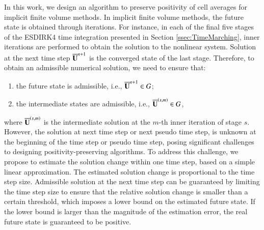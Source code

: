 In this work, we design an algorithm to preserve positivity of cell averages for implicit finite volume methods. In implicit finite volume methods, the future state is obtained through iterations. For instance, in each of the final five stages of the ESDIRK4 time integration presented in Section \ref{ssec:TimeMarching}, inner iterations are performed to obtain the solution to the  nonlinear system. Solution at the next time step $\overline{\mathbf{U}}^{n+1}$ is the converged state of the last stage. Therefore, to obtain an admissible numerical solution, we need to ensure that:
\begin{enumerate}[label=(\alph*)]
    \item the future state is admissible, i.e., $\overline{\mathbf{U}}^{n+1} \in G$;
    \item the intermediate states are admissible, i.e., $\overline{\mathbf{U}}^{\left(s,m\right)} \in G$,
\end{enumerate}
where $\overline{\mathbf{U}}^{\left(s,m\right)}$ is the intermediate solution at the $m$-th inner iteration of stage $s$. However, the solution at next time step or next pseudo time step, is unknown at the beginning of the time step or pseudo time step, posing significant challenges to designing positivity-preserving algorithms. 
To address this challenge, we propose to estimate the solution change within one time step, based on a simple linear approximation. The estimated solution change is proportional to the time step size. Admissible solution at the next time step can be guaranteed by limiting the time step size to ensure that the relative solution change is smaller than a certain threshold, which imposes a lower bound on the estimated future state. If the lower bound is larger than the magnitude of the estimation error, the real future state is guaranteed to be positive.   

